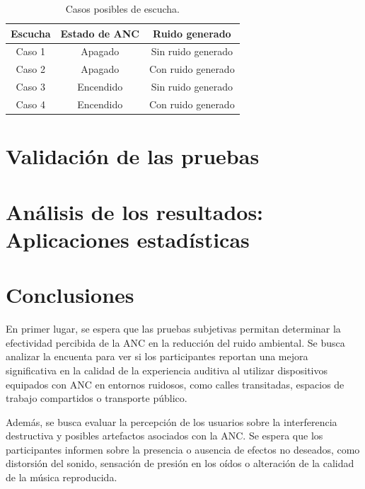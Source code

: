 \documentclass[a4paper,12pt]{article}
\begin{document}
\begin{table}[ht]
\centering
\begin{tabular}{|c|c|c|}
  \hline
  \textbf{Escucha} & \textbf{Estado de ANC} & \textbf{Ruido generado} \\
  \hline
  Caso 1 & Apagado & Sin ruido generado \\
  \hline
  Caso 2 & Apagado & Con ruido generado \\
  \hline
  Caso 3 & Encendido & Sin ruido generado \\
  \hline
  Caso 4 & Encendido & Con ruido generado \\
  \hline
\end{tabular}
\caption{Casos posibles de escucha.}
\label{tab:cases}
\end{table}

\section{Validación de las pruebas}
\label{sec:validation}


\section{Análisis de los resultados: Aplicaciones estadísticas}
\label{sec:results}



\section{Conclusiones}

En primer lugar, se espera que las pruebas subjetivas permitan determinar la efectividad percibida de la ANC en la reducción del ruido ambiental.
Se busca analizar la encuenta para ver si los participantes reportan una mejora significativa en la calidad de la experiencia auditiva al utilizar dispositivos equipados con ANC en entornos ruidosos, como calles transitadas, espacios de trabajo compartidos o transporte público.

Además, se busca evaluar la percepción de los usuarios sobre la interferencia destructiva y posibles artefactos asociados con la ANC.
Se espera que los participantes informen sobre la presencia o ausencia de efectos no deseados, como distorsión del sonido, sensación de presión en los oídos o alteración de la calidad de la música reproducida.
\end{document}
